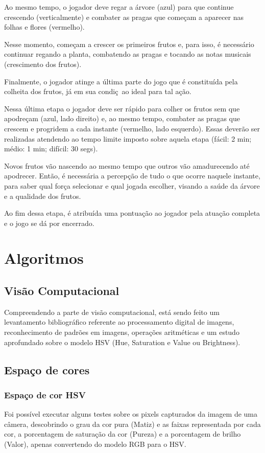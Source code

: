 \documentclass[12pt]{article}
\begin{document}
 Ao mesmo tempo, o jogador deve regar a \'arvore (azul) para que continue crescendo (verticalmente) e combater
 as pragas que come\c cam a aparecer nas folhas e flores (vermelho).
 
 Nesse momento, come\c cam a crescer os primeiros frutos e, para isso, \'e necess\'ario continuar regando
 a planta, combatendo as pragas e tocando as notas musicais (crescimento dos frutos).

 Finalmente, o jogador atinge a \'ultima parte do jogo que \'e constitu\'ida pela colheita dos frutos,
 j\'a em sua condi\c c~ao ideal para tal a\c c\~ao.

 Nessa \'ultima etapa o jogador deve ser r\'apido para colher os frutos sem que apodre\c cam (azul, lado direito)
 e, ao mesmo tempo, combater as pragas que crescem e progridem a cada instante (vermelho, lado esquerdo).
 Essas dever\~ao ser realizadas atendendo ao tempo limite imposto sobre aquela etapa (f\'acil: 2 min; m\'edio:
 1 min; difícil: 30 segs).
 
 Novos frutos v\~ao nascendo ao mesmo tempo que outros v\~ao amadurecendo at\'e apodrecer. Ent\~ao, \'e
 necess\'aria a percep\c c\~ao de tudo o que ocorre naquele instante, para saber qual for\c ca selecionar
 e qual jogada escolher, visando a sa\'ude da \'arvore e a qualidade dos frutos.
 
 Ao fim dessa etapa, \'e atribu\'ida uma pontua\c c\~ao ao jogador pela atua\c c\~ao completa e o jogo se
 d\'a por encerrado.

\section{Algoritmos}
\subsection{Vis\~ao Computacional}

Compreendendo a parte de vis\~ao computacional, est\'a sendo feito um levantamento bibliogr\'afico
referente ao processamento digital de imagens, reconhecimento de padr\~oes em imagens, opera\c c\~oes
aritm\'eticas e um estudo aprofundado sobre o modelo HSV (Hue, Saturation e Value ou Brightness).

\subsection{Espa\c co de cores}
\subsubsection{Espa\c co de cor HSV}
Foi poss\'ivel executar alguns testes sobre os pixels capturados da imagem de uma c\^amera,
descobrindo o grau da cor pura (Matiz) e as faixas representada por cada cor, a porcentagem de satura\c c\~ao
da cor (Pureza) e a porcentagem de brilho (Valor), apenas convertendo do modelo RGB para o HSV.
\end{document}
